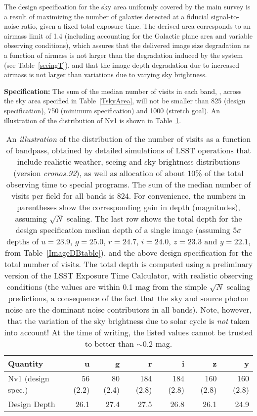 The design specification for the sky area uniformly covered by the main
survey is a result of maximizing the number of galaxies detected at a
fiducial signal-to-noise ratio, given a fixed total exposure time.
The derived area corresponds to an airmass limit of 1.4 (including
accounting for the Galactic plane area and variable observing conditions),
which assures that the delivered image size degradation as a function of
airmass is not larger than the degradation induced by the system
(see Table~\ref{seeingT}), and that the image depth degradation due to
increased airmass is not larger than variations due to varying
sky brightness.



{\bf Specification:} The sum of the median number of visits in each
band,
,
across the sky area specified in Table~\ref{TskyArea},
will not be smaller than 825 (design specification), 750 (minimum
specification) and 1000 (stretch goal). An illustration of the
distribution of Nv1 is shown in Table~\ref{TdepthCoadd}.


\begin{table}[h]
\begin{tabular}{|l|r|r|r|r|r|r|}
\hline
   Quantity           &   u   &   g    &   r   &   i   &   z   &  y   \\
\hline
 Nv1 (design spec.)   &  56 (2.2) & 80 (2.4) &  184 (2.8) & 184 (2.8) & 160 (2.8) & 160 (2.8) \\
\hline
 Design Depth         &    26.1   &    27.4  &     27.5   &  26.8     &   26.1    & 24.9  \\
\hline
\end{tabular}
\caption{An {\it illustration} of the distribution of the number of visits as
a function of bandpass, obtained by detailed simulations of LSST operations
that include realistic weather, seeing and sky brightness distributions
(version {\it cronos.92}), as well as allocation of about 10\% of the
total observing time to special programs. The sum of the median
number of visits per field for all bands is 824. For convenience, the numbers in
parentheses show the corresponding gain in depth (magnitudes), assuming
$\sqrt{N}$ scaling. The last row shows the total
depth for the design specification median depth of a single image (assuming
5$\sigma$ depths of $u=23.9$, $g=25.0$, $r=24.7$, $i=24.0$, $z=23.3$ and
$y=22.1$, from Table~\ref{ImageDBtable}), and the above design specification
for the total number of visits.  The total depth is computed using a
preliminary version of the LSST Exposure Time Calculator, with realistic
observing conditions (the values are within 0.1 mag from the simple $\sqrt{N}$ scaling
predictions, a consequence of the fact that the sky and source photon noise
are the dominant noise contributors in all bands). Note, however, that the
variation of the sky brightness due to solar cycle is {\it not} taken into
account! At the time of writing, the listed values cannot be trusted to
better than $\sim$0.2 mag.}
\label{TdepthCoadd}
\end{table}

